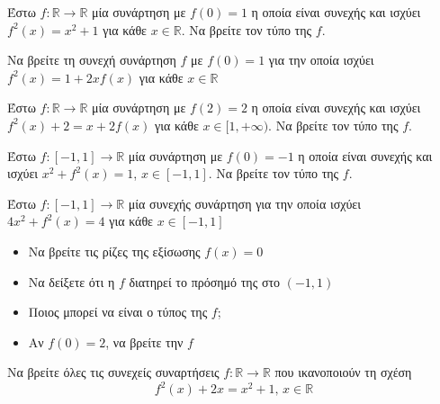 \documentclass{presentation}
\begin{document}
\begin{askisi}
  Έστω $f:\mathbb{R}\to\mathbb{R}$ μία συνάρτηση με $f(0)=1$ η οποία είναι συνεχής και ισχύει $f^2(x)=x^2+1$ για κάθε $x\in\mathbb{R}$. Να βρείτε τον τύπο της $f$.
\end{askisi}

\begin{askisi}
  Να βρείτε τη συνεχή συνάρτηση $f$ με $f(0)=1$ για την οποία ισχύει $f^2(x)=1+2xf(x)$ για κάθε $x\in\mathbb{R}$
\end{askisi}

\begin{askisi}
  Έστω $f:\mathbb{R}\to\mathbb{R}$ μία συνάρτηση με $f(2)=2$ η οποία είναι συνεχής και ισχύει $f^2(x)+2=x+2f(x)$ για κάθε $x\in [1,+\infty)$. Να βρείτε τον τύπο της $f$.
\end{askisi}

\begin{askisi}
  Έστω $f:[-1,1]\to\mathbb{R}$ μία συνάρτηση με $f(0)=-1$ η οποία είναι συνεχής και ισχύει $x^2+f^2(x)=1$, $x\in [-1,1]$. Να βρείτε τον τύπο της $f$.
\end{askisi}

\begin{askisi}
  Έστω $f:[-1,1]\to\mathbb{R}$ μία συνεχής συνάρτηση για την οποία ισχύει $4x^2+f^2(x)=4$ για κάθε $x\in [-1,1]$
  \begin{itemize}[<+->]
    \item Να βρείτε τις ρίζες της εξίσωσης $f(x)=0$
    \item Να δείξετε ότι η $f$ διατηρεί το πρόσημό της στο $(-1,1)$
    \item Ποιος μπορεί να είναι ο τύπος της $f$;
    \item Αν $f(0)=2$, να βρείτε την $f$
  \end{itemize}
\end{askisi}

\begin{askisi}
  Να βρείτε όλες τις συνεχείς συναρτήσεις $f:\mathbb{R}\to\mathbb{R}$ που ικανοποιούν τη σχέση
  $$f^2(x)+2x=x^2+1 \text{, } x\in\mathbb{R}$$
\end{askisi}

\moodle
\end{document}
